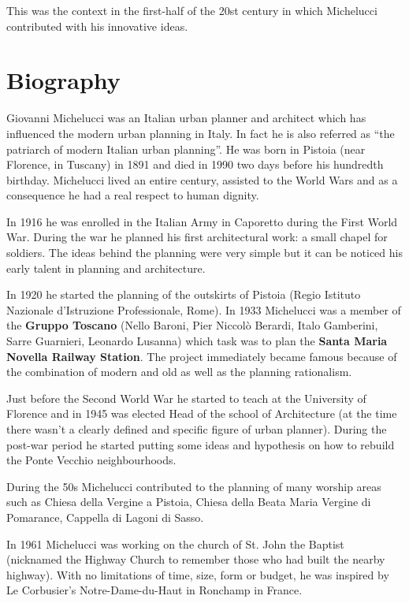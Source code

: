 \documentclass[a4paper,11pt]{article}
\begin{document}
This was the context in the first-half of the 20st century in which Michelucci contributed with his innovative ideas.

\section{Biography}
Giovanni Michelucci was an Italian urban planner and architect which has influenced the modern urban planning in Italy. In fact he is also referred as ``the patriarch of modern Italian urban planning''. He was born in Pistoia (near Florence, in Tuscany) in 1891 and died in 1990 two days before his hundredth birthday. Michelucci lived an entire century, assisted to the World Wars and as a consequence he had a real respect to human dignity.

In 1916 he was enrolled in the Italian Army in Caporetto during the First World War. During the war he planned his first architectural work: a small chapel for soldiers. The ideas behind the planning were very simple but it can be noticed his early talent in planning and architecture.

In 1920 he started the planning of the outskirts of Pistoia (Regio Istituto Nazionale d'Istruzione Professionale, Rome).
In 1933 Michelucci was a member of the \textbf{Gruppo Toscano} (Nello Baroni, Pier Niccolò Berardi, Italo Gamberini, Sarre Guarnieri, Leonardo Lusanna) which task was to plan the \textbf{Santa Maria Novella Railway Station}. The project immediately became famous because of the combination of modern and old as well as the planning rationalism.

Just before the Second World War he started to teach at the University of Florence and in 1945 was elected Head of the school of Architecture (at the time there wasn't a clearly defined and specific figure of urban planner). During the post-war period he started putting some ideas and hypothesis on how to rebuild the Ponte Vecchio neighbourhoods.

During the 50s Michelucci contributed to the planning of many worship areas such as Chiesa della Vergine a Pistoia, Chiesa della Beata Maria Vergine di Pomarance, Cappella di Lagoni di Sasso.

In 1961 Michelucci was working on the church of St. John the Baptist (nicknamed the Highway Church to remember those who had built the nearby highway). With no limitations of time, size, form or budget, he was inspired by Le Corbusier's Notre-Dame-du-Haut in Ronchamp in France.
\end{document}
